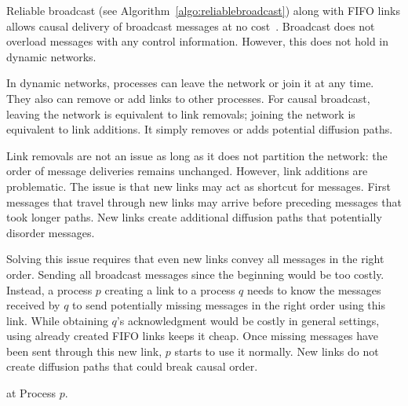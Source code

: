 Reliable broadcast (see Algorithm~\ref{algo:reliablebroadcast}) along with FIFO
links allows causal delivery of broadcast messages at no
cost~\cite{friedman2004causal}. Broadcast does not overload messages with any
control information. However, this does not hold in dynamic networks.

In dynamic networks, processes can leave the network or join it at any time.
They also can remove or add links to other processes. For causal broadcast,
leaving the network is equivalent to link removals; joining the network is
equivalent to link additions. It simply removes or adds potential diffusion
paths.

Link removals are not an issue as long as it does not partition the network: the
order of message deliveries remains unchanged. However, link additions are
problematic.  The issue is that new links may act as shortcut for
messages. First messages that travel through new links may arrive before
preceding messages that took longer paths. New links create additional diffusion
paths that potentially disorder messages. 

Solving this issue requires that even new links convey all messages in the right
order. Sending all broadcast messages since the beginning would be too
costly. Instead, a process $p$ creating a link to a process $q$ needs to know
the messages received by $q$ to send potentially missing messages in the right
order using this link. While obtaining $q$'s acknowledgment would be costly in
general settings, using already created FIFO links keeps it cheap. Once missing
messages have been sent through this new link, $p$ starts to use it
normally. New links do not create diffusion paths that could break causal order.


\begin{algorithm}[h]
  
  \caption{\label{algo:bufferbroadcast}\CBROADCAST at Process $p$.}
\end{algorithm}

